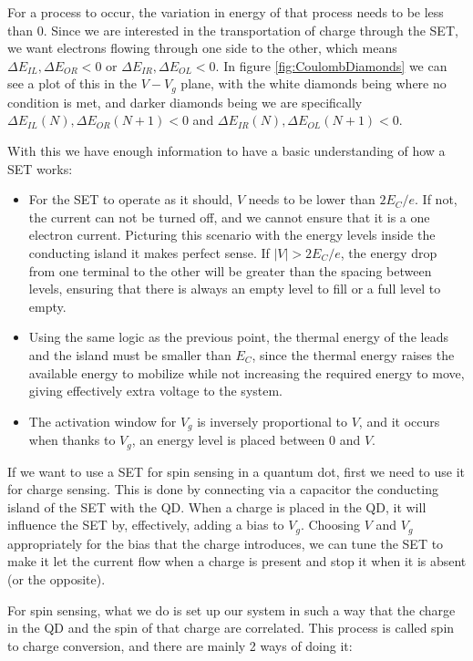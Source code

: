 \documentclass[../main.tex]{subfiles}
\begin{document}
For a process to occur, the variation in energy of that process needs to be
less than \(0\). Since we are interested in the transportation of charge
through the SET, we want electrons flowing through one side to the other,
which means \(\Delta E_{IL}, \Delta E_{OR} < 0\) or
\(\Delta E_{IR}, \Delta E_{OL} < 0\). In figure \ref{fig:CoulombDiamonds}
we can see a plot of this in the \(V-V_{g}\) plane, with the white
diamonds being where no condition is met, and darker diamonds
being we are specifically \(\Delta E_{IL}(N), \Delta E_{OR}(N+1) < 0\) and
\(\Delta E_{IR}(N), \Delta E_{OL}(N+1) < 0\).

With this we have enough information to have a basic understanding of how a
SET works:
\begin{itemize}
    \item For the SET to operate as it should, \(V\) needs to be lower than
        \(2E_{C}/e\). If not, the current can not be turned off, and we cannot
        ensure that it is a one electron current. Picturing this scenario
        with the energy levels inside the conducting island it makes perfect
        sense. If \(|V| > 2E_{C}/e\), the energy drop from one terminal to the
        other will be greater than the spacing between levels, ensuring
        that there is always an empty level to fill or a full level to empty.
    \item Using the same logic as the previous point, the thermal energy of
        the leads and the island must be smaller than \(E_{C}\), since
        the thermal energy raises the available energy to mobilize while
        not increasing the required energy to move, giving effectively
        extra voltage to the system.
    \item The activation window for \(V_{g}\) is inversely proportional to
        \(V\), and it occurs when thanks to \(V_{g}\), an energy level
        is placed between \(0\) and \(V\).
\end{itemize}

If we want to use a SET for spin sensing in a quantum dot, first we need to
use it for charge sensing. This is done by connecting via a capacitor the
conducting island of the SET with the QD. When a charge is placed in the QD, it
will influence the SET by, effectively, adding a bias to \(V_{g}\). Choosing
\(V\) and \(V_{g}\) appropriately for the bias that the charge introduces, we
can tune the SET to make it let the current flow when a charge is present
and stop it when it is absent (or the opposite).

For spin sensing, what we do is set up our system in such a way that the charge
in the QD and the spin of that charge are correlated. This process is called
spin to charge conversion, and there are mainly 2 ways of doing it:
\end{document}
